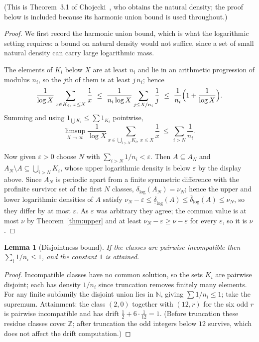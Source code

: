 \documentclass[11pt]{article}
\theoremstyle{plain}
\newtheorem{lemma}[theorem]{Lemma}
\theoremstyle{definition}
\newcommand{\N}{\mathbb{N}}
\newcommand{\dlog}{\delta_{\log}}
\begin{document}
\noindent(This is Theorem~3.1 of Chojecki~\cite{Choj26}, who
obtains the natural density; the proof below is included because
its harmonic union bound is used throughout.)

\begin{proof}
We first record the harmonic union bound, which is what the
logarithmic setting requires: a bound on natural density would
not suffice, since a set of small natural density can carry
large logarithmic mass.

The elements of $K_i$ below $X$ are at least $n_i$ and lie in an
arithmetic progression of modulus $n_i$, so the $j$th of them is
at least $j\,n_i$; hence
\[
  \frac{1}{\log X}\sum_{x\in K_i,\ x\le X}\frac1x
  \ \le\ \frac{1}{n_i\log X}\sum_{j\le X/n_i}\frac1j
  \ \le\ \frac{1}{n_i}\Bigl(1+\frac{1}{\log X}\Bigr).
\]
Summing and using $1_{\bigcup K_i}\le\sum 1_{K_i}$ pointwise,
\[
  \limsup_{X\to\infty}\frac{1}{\log X}
  \sum_{x\in\bigcup_{i>N}K_i,\ x\le X}\frac1x
  \ \le\ \sum_{i>N}\frac1{n_i}.
\]

Now given $\varepsilon>0$ choose $N$ with
$\sum_{i>N}1/n_i<\varepsilon$.  Then $A\subseteq A_N$ and
$A_N\setminus A\subseteq\bigcup_{i>N}K_i$, whose upper
logarithmic density is below $\varepsilon$ by the display above.
Since $A_N$ is periodic apart from a finite symmetric
difference with the profinite survivor set of the first $N$
classes, $\dlog(A_N)=\nu_N$; hence the upper and lower
logarithmic
densities of $A$ satisfy
$\nu_N-\varepsilon\le\underline{\delta}_{\log}(A)
\le\overline{\delta}_{\log}(A)\le\nu_N$, so they differ by at
most $\varepsilon$.  As $\varepsilon$ was
arbitrary they agree; the common value is at most $\nu$ by
Theorem~\ref{thm:upper} and at least $\nu_N-\varepsilon\ge
\nu-\varepsilon$ for every $\varepsilon$, so it is $\nu$.
\end{proof}

\begin{lemma}[Disjointness bound]\label{lem:A}
If the classes are pairwise incompatible then
$\sum_i 1/n_i\le 1$, and the constant $1$ is attained.
\end{lemma}

\begin{proof}
Incompatible classes have no common solution, so the sets $K_i$
are pairwise disjoint; each has density $1/n_i$ since truncation
removes finitely many elements.  For any finite subfamily the
disjoint union lies in $\N$, giving $\sum 1/n_i\le1$; take the
supremum.  Attainment: the class $(2,0)$ together with $(12,r)$
for the six odd $r$ is pairwise incompatible and has drift
$\tfrac12+6\cdot\tfrac1{12}=1$.  (Before truncation these
residue classes cover $\mathbb{Z}$; after truncation the odd
integers below $12$ survive, which does not affect the drift
computation.)
\end{proof}
\end{document}
